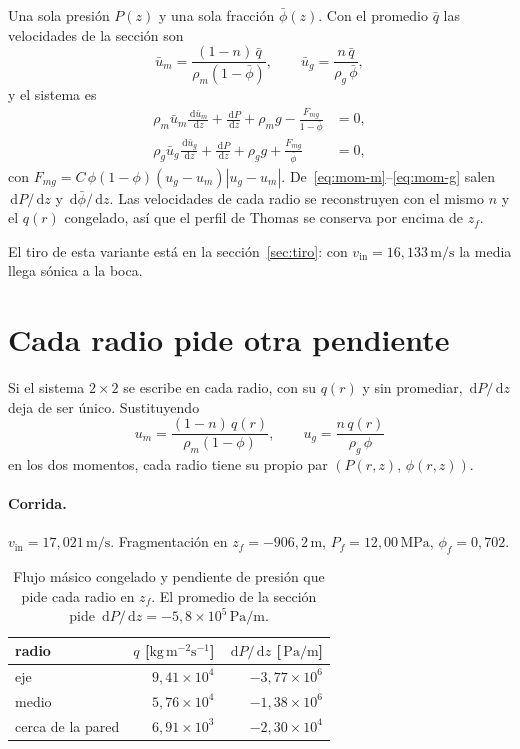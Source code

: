 \documentclass[11pt,a4paper]{article}
\newcommand{\dd}{\,\mathrm{d}}
\newcommand{\vin}{v_{\mathrm{in}}}
\newcommand{\MPa}{\ensuremath{\,\mathrm{MPa}}}
\newcommand{\ms}{\ensuremath{\,\mathrm{m/s}}}
\newcommand{\Pam}{\ensuremath{\,\mathrm{Pa/m}}}
\begin{document}
Una sola presión $P(z)$ y una sola fracción $\bar\phi(z)$. Con el
promedio $\bar q$ las velocidades de la sección son
\[
\bar u_m=\frac{(1-n)\,\bar q}{\rho_m(1-\bar\phi)},\qquad
\bar u_g=\frac{n\,\bar q}{\rho_g\,\bar\phi},
\]
y el sistema es
\begin{align}
\rho_m\bar u_m\frac{\dd\bar u_m}{\dd z}+\frac{\dd P}{\dd z}+\rho_m g
  -\frac{F_{mg}}{1-\bar\phi}&=0, \label{eq:mom-m}\\[4pt]
\rho_g\bar u_g\frac{\dd\bar u_g}{\dd z}+\frac{\dd P}{\dd z}+\rho_g g
  +\frac{F_{mg}}{\bar\phi}&=0, \label{eq:mom-g}
\end{align}
con
$F_{mg}=C\,\phi(1-\phi)(u_g-u_m)|u_g-u_m|$.
De~\eqref{eq:mom-m}--\eqref{eq:mom-g} salen $\dd P/\dd z$ y
$\dd\bar\phi/\dd z$. Las velocidades de cada radio se reconstruyen con
el mismo $n$ y el $q(r)$ congelado, así que el perfil de Thomas se
conserva por encima de $z_f$.

El tiro de esta variante está en la sección~\ref{sec:tiro}: con
$\vin=16{,}133\ms$ la media llega sónica a la boca.

\section{Cada radio pide otra pendiente}
\label{sec:pendientes}

Si el sistema $2\times 2$ se escribe en cada radio, con su $q(r)$ y sin
promediar, $\dd P/\dd z$ deja de ser único. Sustituyendo
\[
u_m=\frac{(1-n)\,q(r)}{\rho_m(1-\phi)},\qquad
u_g=\frac{n\,q(r)}{\rho_g\,\phi}
\]
en los dos momentos, cada radio tiene su propio par
$(P(r,z),\,\phi(r,z))$.

\paragraph{Corrida.}
$\vin=17{,}021\ms$. Fragmentación en $z_f=-906{,}2\,\mathrm{m}$,
$P_f=12{,}00\MPa$, $\phi_f=0{,}702$.

\begin{table}[ht]
\centering
\caption{Flujo másico congelado y pendiente de presión que pide cada
radio en $z_f$. El promedio de la sección pide
$\dd P/\dd z=-5{,}8\times 10^{5}\Pam$.}
\label{tab:dpdz}
\begin{tabular}{@{}lrr@{}}
\toprule
radio & $q$ [$\mathrm{kg\,m^{-2}s^{-1}}$] & $\dd P/\dd z$ [\Pam] \\
\midrule
eje            & $9{,}41\times 10^{4}$ & $-3{,}77\times 10^{6}$ \\
medio          & $5{,}76\times 10^{4}$ & $-1{,}38\times 10^{6}$ \\
cerca de la pared & $6{,}91\times 10^{3}$ & $-2{,}30\times 10^{4}$ \\
\bottomrule
\end{tabular}
\end{table}
\end{document}
